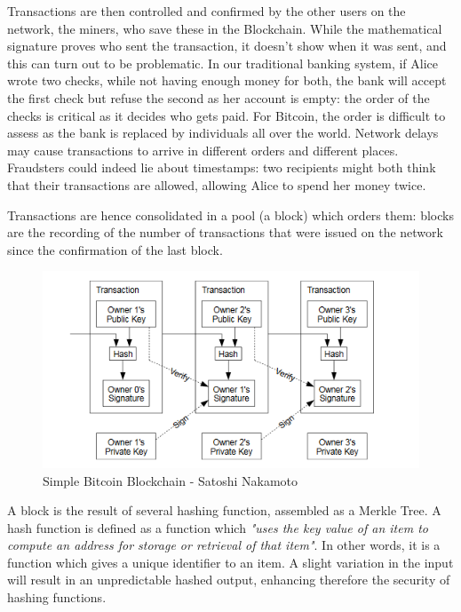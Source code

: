 \documentclass[11pt]{report}
\begin{document}
Transactions are then controlled and confirmed by the other users on the network, the miners, who save these in the Blockchain. \newline
While the mathematical signature proves who sent the transaction, it doesn't show when it was sent, and this can turn out to be problematic. \newline In our traditional banking system, if Alice wrote two checks, while not having enough money for both, the bank will accept the first check but refuse the second as her account is empty: the order of the checks is critical as it decides who gets paid. \clearpage
For Bitcoin, the order is difficult to assess  as the bank is replaced by individuals all over the world. Network delays may cause transactions to arrive in different orders and different places. Fraudsters could indeed lie about timestamps: two recipients might both think that their transactions are allowed, allowing Alice to spend her money twice. \medbreak

Transactions are hence consolidated in a pool (a block) which orders them: blocks are the recording of the number of transactions that were issued on the network since the confirmation of the last block.
\medbreak

\begin{figure}[!h]
\centering
\includegraphics{Chap1/Transaction}
\caption{Simple Bitcoin Blockchain - Satoshi Nakamoto}
\label{Transaction}
\end{figure}

\medbreak
A block is the result of several hashing function, assembled as a Merkle Tree\cite{Merkle}.\newline
A hash function is defined as a function which \textit{"uses the key value of an item to compute an address for storage or retrieval of that item"}\cite{KNOTT}.\newline
In other words, it is a function which gives a unique identifier to an item. A slight variation in the input will result in an unpredictable hashed output, enhancing therefore the security of hashing functions. \clearpage
 
\end{document}
